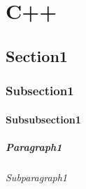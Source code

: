 \chapter{C++}

\section{Section1}
\subsection{Subsection1}
\subsubsection{Subsubsection1}
\paragraph{Paragraph1}
\subparagraph{Subparagraph1}


